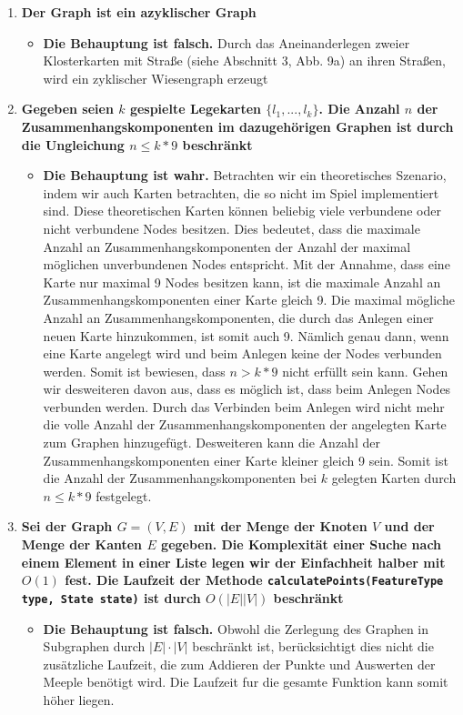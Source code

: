 \begin{enumerate}

\item \textbf{Der Graph ist ein azyklischer Graph}
	\begin{itemize}
	\item[]
		\textbf{Die Behauptung ist falsch.} Durch das Aneinanderlegen zweier Klosterkarten
		mit Straße (siehe Abschnitt 3, Abb. 9a) an ihren Straßen, wird ein zyklischer
		Wiesengraph erzeugt
	\end{itemize}
	
\item \textbf{Gegeben seien $k$ gespielte Legekarten $\{l_1,. . . ,l_k\}$. Die Anzahl $n$ der
		Zusammenhangskomponenten im dazugehörigen Graphen ist durch die
		Ungleichung $n \leq k * 9$ beschränkt}
		\begin{itemize}
		
		\item[]
			\textbf{Die Behauptung ist wahr.} Betrachten wir ein theoretisches Szenario, indem wir 
			auch Karten betrachten, die so nicht im Spiel implementiert sind. Diese theoretischen Karten können 
			beliebig viele verbundene oder nicht verbundene Nodes besitzen. Dies bedeutet, dass die maximale
			Anzahl an Zusammenhangskomponenten der Anzahl der maximal möglichen unverbundenen Nodes entspricht.
			Mit der Annahme, dass eine Karte nur maximal 9 Nodes besitzen kann, ist die maximale Anzahl an
			Zusammenhangskomponenten einer Karte gleich 9. Die maximal mögliche Anzahl an 
			Zusammenhangskomponenten, die durch das Anlegen einer neuen Karte hinzukommen, ist somit auch 9. 
			Nämlich genau dann, wenn eine Karte angelegt wird und beim Anlegen keine der Nodes verbunden
			werden. Somit ist bewiesen, dass $n > k*9$ nicht erfüllt sein kann. Gehen wir desweiteren davon
			aus, dass es möglich ist, dass beim Anlegen Nodes verbunden werden. Durch das Verbinden beim 
			Anlegen wird nicht mehr die volle Anzahl der Zusammenhangskomponenten der angelegten Karte zum
			Graphen hinzugefügt. Desweiteren kann die Anzahl der Zusammenhangskomponenten einer Karte kleiner
			gleich 9 sein. Somit ist die Anzahl der Zusammenhangskomponenten bei $k$ gelegten Karten durch
			$n \leq k*9$ festgelegt.   
		\end{itemize}
		
\item \textbf{Sei der Graph $G = (V,E)$ mit der Menge der Knoten $V$ und der Menge der Kanten $E$ gegeben. Die Komplexität einer Suche nach einem Element in einer Liste legen wir der Einfachheit halber mit $O(1)$ fest. Die
			Laufzeit der Methode \texttt{calculatePoints(FeatureType type, State state)} ist durch $O(|E||V |)$ beschränkt}
			\begin{itemize}
			\item[]
				\textbf{Die Behauptung ist falsch.} Obwohl die Zerlegung des Graphen in Subgraphen durch $|E| · |V |$ beschränkt ist, berücksichtigt dies nicht die zusätzliche
				Laufzeit, die zum Addieren der Punkte und Auswerten der Meeple benötigt
				wird. Die Laufzeit fur die gesamte Funktion kann somit höher liegen.
			\end{itemize}

\end{enumerate}


